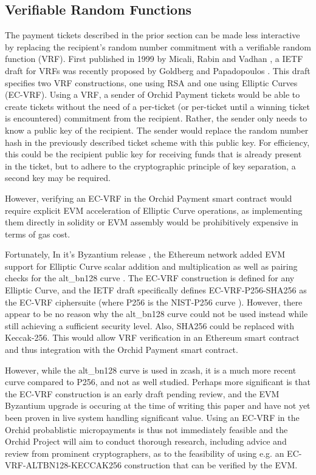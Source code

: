 \subsection{Verifiable Random Functions}

The payment tickets described in the prior section can be made less interactive by replacing the recipient's random number commitment with a verifiable random function (VRF). First published in 1999 by Micali, Rabin and Vadhan \cite{VRF}, a IETF draft for VRFs was recently proposed by Goldberg and Papadopoulos \cite{VRF00}. This draft specifies two VRF constructions, one using RSA and one using Elliptic Curves (EC-VRF).
Using a VRF, a sender of Orchid Payment tickets would be able to create tickets without the need of a per-ticket (or per-ticket until a winning ticket is encountered) commitment from the recipient. Rather, the sender only needs to know a public key of the recipient. The sender would replace the random number hash in the previously described ticket scheme with this public key. For efficiency, this could be the recipient public key for receiving funds that is already present in the ticket, but to adhere to the cryptographic principle of key separation, a second key may be required.

However, verifying an EC-VRF in the Orchid Payment smart contract would require explicit EVM acceleration of Elliptic Curve operations, as implementing them directly in solidity or EVM assembly would be prohibitively expensive in terms of gas cost.

Fortunately, In it's Byzantium release \cite{ETHByz}, the Ethereum network added EVM support for Elliptic Curve scalar addition and multiplication\cite{EIP196} as well as pairing checks for the alt\_bn128 curve\cite{EIP197} \cite{ALTBN128}. The EC-VRF construction is defined for any Elliptic Curve, and the IETF draft specifically defines EC-VRF-P256-SHA256 as the EC-VRF ciphersuite (where P256 is the NIST-P256 curve \cite{P256}). However, there appear to be no reason why the alt\_bn128 curve could not be used instead while still achieving a sufficient security level. Also, SHA256 could be replaced with Keccak-256. This would allow VRF verification in an Ethereum smart contract and thus integration with the Orchid Payment smart contract.

However, while the alt\_bn128 curve is used in zcash, it is a much more recent curve compared to P256, and not as well studied. Perhaps more significant is that the EC-VRF construction is an early draft pending review, and the EVM Byzantium upgrade is occuring at the time of writing this paper and have not yet been proven in live system handling significant value. Using an EC-VRF in the Orchid probablistic micropayments is thus not immediately feasible and the Orchid Project will aim to conduct thorough research, including advice and review from prominent cryptographers, as to the feasibility of using e.g. an EC-VRF-ALTBN128-KECCAK256 construction that can be verified by the EVM.

